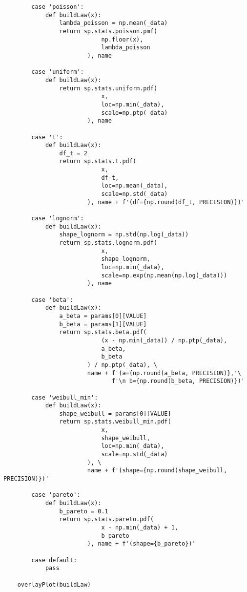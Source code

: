\documentclass[a4paper, 14pt]{extarticle}
\begin{document}
\begin{lstlisting}
        case 'poisson': 
            def buildLaw(x):
                lambda_poisson = np.mean(_data) 
                return sp.stats.poisson.pmf(
                            np.floor(x), 
                            lambda_poisson
                        ), name
            
        case 'uniform': 
            def buildLaw(x):
                return sp.stats.uniform.pdf(
                            x, 
                            loc=np.min(_data), 
                            scale=np.ptp(_data)
                        ), name

        case 't': 
            def buildLaw(x):
                df_t = 2
                return sp.stats.t.pdf(
                            x, 
                            df_t, 
                            loc=np.mean(_data), 
                            scale=np.std(_data)
                        ), name + f'(df={np.round(df_t, PRECISION)})'

        case 'lognorm': 
            def buildLaw(x):
                shape_lognorm = np.std(np.log(_data))
                return sp.stats.lognorm.pdf(
                            x, 
                            shape_lognorm, 
                            loc=np.min(_data), 
                            scale=np.exp(np.mean(np.log(_data)))
                        ), name

        case 'beta':  
            def buildLaw(x):
                a_beta = params[0][VALUE]
                b_beta = params[1][VALUE]
                return sp.stats.beta.pdf(
                            (x - np.min(_data)) / np.ptp(_data), 
                            a_beta, 
                            b_beta
                        ) / np.ptp(_data), \
                        name + f'(a={np.round(a_beta, PRECISION)},'\
                               f'\n b={np.round(b_beta, PRECISION)})'
            
        case 'weibull_min': 
            def buildLaw(x):
                shape_weibull = params[0][VALUE]
                return sp.stats.weibull_min.pdf(
                            x, 
                            shape_weibull, 
                            loc=np.min(_data), 
                            scale=np.std(_data)
                        ), \
                        name + f'(shape={np.round(shape_weibull, PRECISION)})'

        case 'pareto': 
            def buildLaw(x):
                b_pareto = 0.1
                return sp.stats.pareto.pdf(
                            x - np.min(_data) + 1, 
                            b_pareto
                        ), name + f'(shape={b_pareto})'
            
        case default:
            pass

    overlayPlot(buildLaw)
\end{lstlisting}
\end{document}
